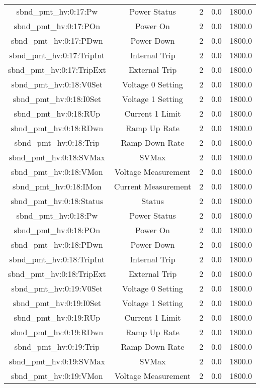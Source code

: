 \begin{table}[ptb]
\begin{tabular}{c | c c c c}
sbnd_pmt_hv:0:17:Pw & Power Status & 2 & 0.0 & 1800.0\\ 
sbnd_pmt_hv:0:17:POn & Power On & 2 & 0.0 & 1800.0\\ 
sbnd_pmt_hv:0:17:PDwn & Power Down & 2 & 0.0 & 1800.0\\ 
sbnd_pmt_hv:0:17:TripInt & Internal Trip & 2 & 0.0 & 1800.0\\ 
sbnd_pmt_hv:0:17:TripExt & External Trip & 2 & 0.0 & 1800.0\\ 
sbnd_pmt_hv:0:18:V0Set & Voltage 0 Setting & 2 & 0.0 & 1800.0\\ 
sbnd_pmt_hv:0:18:I0Set & Voltage 1 Setting & 2 & 0.0 & 1800.0\\ 
sbnd_pmt_hv:0:18:RUp & Current 1 Limit & 2 & 0.0 & 1800.0\\ 
sbnd_pmt_hv:0:18:RDwn & Ramp Up Rate & 2 & 0.0 & 1800.0\\ 
sbnd_pmt_hv:0:18:Trip & Ramp Down Rate & 2 & 0.0 & 1800.0\\ 
sbnd_pmt_hv:0:18:SVMax & SVMax & 2 & 0.0 & 1800.0\\ 
sbnd_pmt_hv:0:18:VMon & Voltage Measurement & 2 & 0.0 & 1800.0\\ 
sbnd_pmt_hv:0:18:IMon & Current Measurement & 2 & 0.0 & 1800.0\\ 
sbnd_pmt_hv:0:18:Status & Status & 2 & 0.0 & 1800.0\\ 
sbnd_pmt_hv:0:18:Pw & Power Status & 2 & 0.0 & 1800.0\\ 
sbnd_pmt_hv:0:18:POn & Power On & 2 & 0.0 & 1800.0\\ 
sbnd_pmt_hv:0:18:PDwn & Power Down & 2 & 0.0 & 1800.0\\ 
sbnd_pmt_hv:0:18:TripInt & Internal Trip & 2 & 0.0 & 1800.0\\ 
sbnd_pmt_hv:0:18:TripExt & External Trip & 2 & 0.0 & 1800.0\\ 
sbnd_pmt_hv:0:19:V0Set & Voltage 0 Setting & 2 & 0.0 & 1800.0\\ 
sbnd_pmt_hv:0:19:I0Set & Voltage 1 Setting & 2 & 0.0 & 1800.0\\ 
sbnd_pmt_hv:0:19:RUp & Current 1 Limit & 2 & 0.0 & 1800.0\\ 
sbnd_pmt_hv:0:19:RDwn & Ramp Up Rate & 2 & 0.0 & 1800.0\\ 
sbnd_pmt_hv:0:19:Trip & Ramp Down Rate & 2 & 0.0 & 1800.0\\ 
sbnd_pmt_hv:0:19:SVMax & SVMax & 2 & 0.0 & 1800.0\\ 
sbnd_pmt_hv:0:19:VMon & Voltage Measurement & 2 & 0.0 & 1800.0\\ 

\end{tabular}
\end{table}

